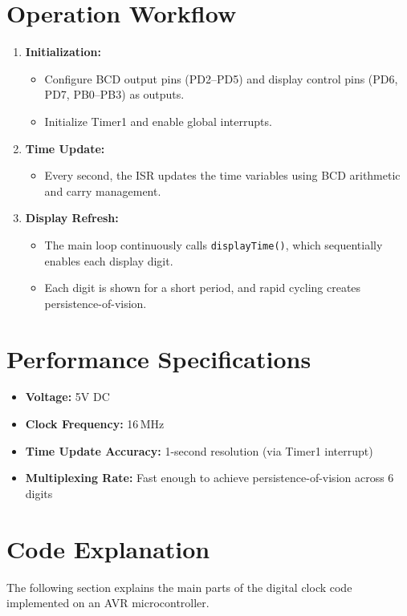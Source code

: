 \documentclass{article}
\theoremstyle{remark}
\begin{document}
\section{Operation Workflow}
\begin{enumerate}
    \item \textbf{Initialization:}
    \begin{itemize}[noitemsep]
        \item Configure BCD output pins (PD2--PD5) and display control pins (PD6, PD7, PB0--PB3) as outputs.
        \item Initialize Timer1 and enable global interrupts.
    \end{itemize}
    \item \textbf{Time Update:}
    \begin{itemize}[noitemsep]
        \item Every second, the ISR updates the time variables using BCD arithmetic and carry management.
    \end{itemize}
    \item \textbf{Display Refresh:}
    \begin{itemize}[noitemsep]
        \item The main loop continuously calls \texttt{displayTime()}, which sequentially enables each display digit.
        \item Each digit is shown for a short period, and rapid cycling creates persistence-of-vision.
    \end{itemize}
\end{enumerate}

\section{Performance Specifications}
\begin{itemize}[noitemsep]
    \item \textbf{Voltage:} 5V DC
    \item \textbf{Clock Frequency:} 16\,MHz
    \item \textbf{Time Update Accuracy:} 1-second resolution (via Timer1 interrupt)
    \item \textbf{Multiplexing Rate:} Fast enough to achieve persistence-of-vision across 6 digits
\end{itemize}

\section{Code Explanation}
The following section explains the main parts of the digital clock code implemented on an AVR microcontroller.
\end{document}
